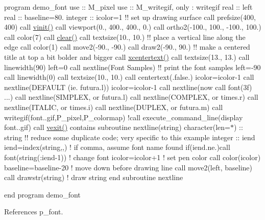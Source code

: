 program demo\+\_\+font use \+:\+: M\+\_\+pixel use \+:\+: M\+\_\+writegif, only \+: writegif real \+:\+: left real \+:\+: baseline=80. integer \+:\+: icolor=1 !! set up drawing surface call prefsize(400, 400) call \hyperlink{namespacem__pixel_ac03ca8f23fdadb60599b6ea4dc87a6d9}{vinit()} call viewport(0., 400., 400., 0.) call ortho2(-\/100., 100., -\/100., 100.) call color(7) call \hyperlink{namespacem__pixel_af3b81a21a0b2f6b5eddd09c031bd6173}{clear()} call textsize(10., 10.) !! place a vertical line along the edge call color(1) call move2(-\/90., -\/90.) call draw2(-\/90., 90.) !! make a centered title at top a bit bolder and bigger call \hyperlink{namespacem__pixel_a1e0c43d36b35eafea921f91c31d8a478}{xcentertext()} call textsize(13., 13.) call linewidth(90) left=0 call nextline(\textquotesingle{}Font Samples\textquotesingle{}) !! print the font samples left=-\/90 call linewidth(0) call textsize(10., 10.) call centertext(.false.) icolor=icolor-\/1 call nextline(\textquotesingle{}D\+E\+F\+A\+U\+LT (ie. futura.\+l)\textquotesingle{}) icolor=icolor-\/1 call nextline(\textquotesingle{}now call font(3f) ...\textquotesingle{}) call nextline(\textquotesingle{}S\+I\+M\+P\+L\+EX, or futura.\+l\textquotesingle{}) call nextline(\textquotesingle{}C\+O\+M\+P\+L\+EX, or times.\+r\textquotesingle{}) call nextline(\textquotesingle{}I\+T\+A\+L\+IC, or times.\+i\textquotesingle{}) call nextline(\textquotesingle{}D\+U\+P\+L\+EX, or futura.\+m\textquotesingle{}) call writegif(\textquotesingle{}font..\+gif\textquotesingle{},P\+\_\+pixel,P\+\_\+colormap) !call execute\+\_\+command\+\_\+line(\textquotesingle{}display font..\+gif\textquotesingle{}) call \hyperlink{namespacem__pixel_a19ad6b65752322b0029a62cc0ebec3e8}{vexit()} contains subroutine nextline(string) character(len=$\ast$) \+:\+: string !! reduce some duplicate code; very specific to this example integer \+:\+: iend iend=index(string,\textquotesingle{},\textquotesingle{}) ! if comma, assume font name found if(iend.\+ne.)call font(string(\+:iend-\/1)) ! change font icolor=icolor+1 ! set pen color call color(icolor) baseline=baseline-\/20 ! move down before drawing line call move2(left, baseline) call drawstr(string) ! draw string end subroutine nextline

end program demo\+\_\+font 

References p\+\_\+font.

\mbox{\label{namespacem__pixel_acacbc4462423b9aa0f591cbe7aba4ec6}} 
